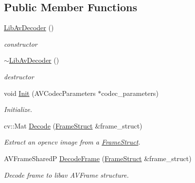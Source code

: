 \subsection*{Public Member Functions}
\begin{DoxyCompactItemize}
\item 
\mbox{\label{classmoetsi_1_1ssp_1_1LibAvDecoder_a68174e3bd10e03eaabee437826399b64}} 
\hyperlink{classmoetsi_1_1ssp_1_1LibAvDecoder_a68174e3bd10e03eaabee437826399b64}{Lib\+Av\+Decoder} ()
\begin{DoxyCompactList}\small\item\em constructor \end{DoxyCompactList}\item 
\mbox{\label{classmoetsi_1_1ssp_1_1LibAvDecoder_a1aafd7da5bdd011aae77075b71e52f51}} 
\hyperlink{classmoetsi_1_1ssp_1_1LibAvDecoder_a1aafd7da5bdd011aae77075b71e52f51}{$\sim$\+Lib\+Av\+Decoder} ()
\begin{DoxyCompactList}\small\item\em destructor \end{DoxyCompactList}\item 
void \hyperlink{classmoetsi_1_1ssp_1_1LibAvDecoder_a631ce4158ab4f456a26951674f96a803}{Init} (A\+V\+Codec\+Parameters $\ast$codec\+\_\+parameters)
\begin{DoxyCompactList}\small\item\em Initialize. \end{DoxyCompactList}\item 
cv\+::\+Mat \hyperlink{classmoetsi_1_1ssp_1_1LibAvDecoder_a4206a4581de1b93d6c6a0835e8cf4ac8}{Decode} (\hyperlink{structmoetsi_1_1ssp_1_1FrameStruct}{Frame\+Struct} \&frame\+\_\+struct)
\begin{DoxyCompactList}\small\item\em Extract an opencv image from a \hyperlink{structmoetsi_1_1ssp_1_1FrameStruct}{Frame\+Struct}. \end{DoxyCompactList}\item 
A\+V\+Frame\+SharedP \hyperlink{classmoetsi_1_1ssp_1_1LibAvDecoder_a41c94bd7fa9576902ea0a6e95e59d93e}{Decode\+Frame} (\hyperlink{structmoetsi_1_1ssp_1_1FrameStruct}{Frame\+Struct} \&frame\+\_\+struct)
\begin{DoxyCompactList}\small\item\em Decode frame to libav A\+V\+Frame structure. \end{DoxyCompactList}\end{DoxyCompactItemize}



